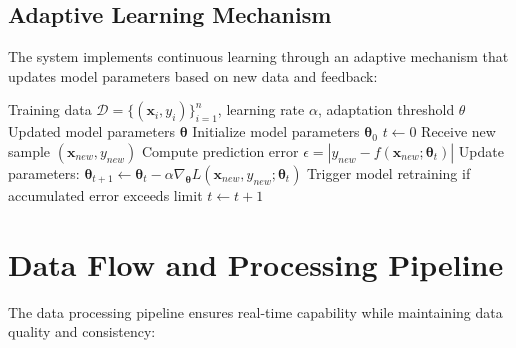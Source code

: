\documentclass[12pt,a4paper]{article}
\begin{document}
\subsection{Adaptive Learning Mechanism}

The system implements continuous learning through an adaptive mechanism that updates model parameters based on new data and feedback:

\begin{algorithm}
\caption{Adaptive Learning Algorithm}
\begin{algorithmic}[1]
\REQUIRE Training data $\mathcal{D} = \{(\mathbf{x}_i, y_i)\}_{i=1}^n$, learning rate $\alpha$, adaptation threshold $\theta$
\ENSURE Updated model parameters $\boldsymbol{\theta}$
\STATE Initialize model parameters $\boldsymbol{\theta}_0$
\STATE $t \leftarrow 0$
    \STATE Receive new sample $(\mathbf{x}_{new}, y_{new})$
    \STATE Compute prediction error $\epsilon = |y_{new} - f(\mathbf{x}_{new}; \boldsymbol{\theta}_t)|$
    \IF{$\epsilon > \theta$}
        \STATE Update parameters: $\boldsymbol{\theta}_{t+1} \leftarrow \boldsymbol{\theta}_t - \alpha \nabla_{\boldsymbol{\theta}} L(\mathbf{x}_{new}, y_{new}; \boldsymbol{\theta}_t)$
        \STATE Trigger model retraining if accumulated error exceeds limit
    \ENDIF
    \STATE $t \leftarrow t + 1$
\ENDWHILE
\end{algorithmic}
\end{algorithm}

\section{Data Flow and Processing Pipeline}

The data processing pipeline ensures real-time capability while maintaining data quality and consistency:
\end{document}
